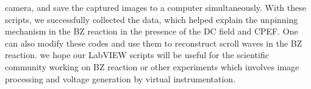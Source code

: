 \documentclass[journal=jacsat,manuscript=article]{achemso}
\begin{document}
camera, and save the captured images to a computer
simultaneously. With these scripts, we successfully collected the
data, which helped explain the unpinning mechanism in the BZ reaction
in the presence of the DC field and CPEF. One can also modify these
codes and use them to reconstruct scroll waves in the BZ reaction.
we hope our LabVIEW scripts will be useful for the scientific
community working on BZ reaction or other experiments which involves
image processing and voltage generation by virtual instrumentation.
\begin{acknowledgement}
\end{acknowledgement}

\begin{suppinfo}
\end{suppinfo}


\end{document}
